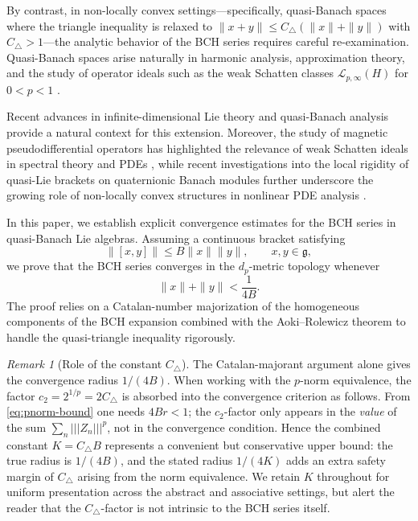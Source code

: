 \documentclass[10pt]{amsart}
\theoremstyle{definition}
\theoremstyle{remark}
\newtheorem{remark}[theorem]{Remark}
\numberwithin{equation}{section}
\newcommand{\Ctri}{C_{\triangle}}    %
\newcommand{\Cbracket}{B}            %
\newcommand{\Ctotal}{K}              %
\newcommand{\pnorm}[1]{\left\vert\!\left\vert\!\left\vert #1 \right\vert\!\right\vert\!\right\vert} %
\begin{document}
By contrast, in non-locally convex settings---specifically, quasi-Banach spaces where the
triangle inequality is relaxed to $\|x+y\|\le \Ctri(\|x\|+\|y\|)$ with $\Ctri>1$---the
analytic behavior of the BCH series requires careful re-examination.  Quasi-Banach spaces
arise naturally in harmonic analysis, approximation theory, and the study of operator
ideals such as the weak Schatten classes $\mathcal{L}_{p,\infty}(H)$ for $0<p<1$
\cite{KaltonSukochev2021, Albiac2023}.

Recent advances in infinite-dimensional Lie theory \cite{Glockner2020, NeebSalmasian2020}
and quasi-Banach analysis \cite{Kalton2003} provide a natural context for this extension.
Moreover, the study of magnetic pseudodifferential operators has highlighted the relevance
of weak Schatten ideals in spectral theory and PDEs \cite{AthmouniPurice2018}, while
recent investigations into the local rigidity of quasi-Lie brackets on quaternionic
Banach modules further underscore the growing role of non-locally convex structures in
nonlinear PDE analysis \cite{Athmouni2026}.

In this paper, we establish explicit convergence estimates for the BCH series in
quasi-Banach Lie algebras.  Assuming a continuous bracket satisfying
\[
  \|[x, y]\|\le \Cbracket \|x\| \|y\|, \qquad x, y \in \mathfrak{g},
\]
we prove that the BCH series converges in the $d_p$-metric topology whenever
\[
  \|x\| + \|y\| < \frac{1}{4\Cbracket}.
\]
The proof relies on a Catalan-number majorization of the homogeneous components of the
BCH expansion combined with the Aoki--Rolewicz theorem to handle the quasi-triangle
inequality rigorously.

\begin{remark}[Role of the constant $\Ctri$]\label{rem:role-ctri}
The Catalan-majorant argument alone gives the convergence radius $1/(4\Cbracket)$.  When
working with the $p$-norm equivalence, the factor $c_2 = 2^{1/p} = 2\Ctri$ is absorbed
into the convergence criterion as follows.  From \eqref{eq:pnorm-bound} one needs
$4\Cbracket r < 1$; the $c_2$-factor only appears in the \emph{value} of the sum
$\sum_n\pnorm{Z_n}^p$, not in the convergence condition.  Hence the combined constant
$\Ctotal = \Ctri\Cbracket$ represents a convenient but conservative upper bound: the true
radius is $1/(4\Cbracket)$, and the stated radius $1/(4\Ctotal)$ adds an extra safety
margin of $\Ctri$ arising from the norm equivalence.  We retain $\Ctotal$ throughout for
uniform presentation across the abstract and associative settings, but alert the reader
that the $\Ctri$-factor is not intrinsic to the BCH series itself.
\end{remark}
\end{document}
